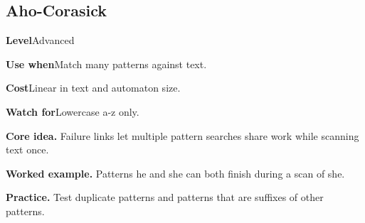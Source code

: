 \documentclass[10pt,letterpaper]{article}
\newcommand{\entrylabel}[1]{\textcolor{accent}{\bfseries #1}}
\begin{document}
\subsection{Aho-Corasick}
\begin{guidebox}\small
\entrylabel{Level}\quad Advanced\par
\entrylabel{Use when}\quad Match many patterns against text.\par
\entrylabel{Cost}\quad Linear in text and automaton size.\par
\entrylabel{Watch for}\quad Lowercase a-z only.\par
\end{guidebox}
\noindent\textbf{Core idea.} Failure links let multiple pattern searches share work while scanning text once.\par
\noindent\textbf{Worked example.} Patterns he and she can both finish during a scan of she.\par
\noindent\textbf{Practice.} Test duplicate patterns and patterns that are suffixes of other patterns.\par
\end{document}
